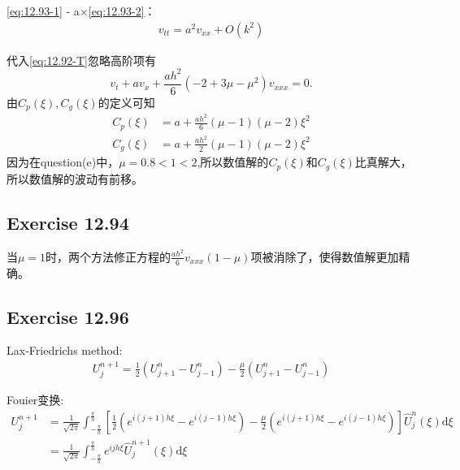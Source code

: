 \documentclass[UTF8]{ctexart}
\newcommand{\dif}{\mathrm{d}}
\begin{document}
\eqref{eq:12.93-1} - a$\times$\eqref{eq:12.93-2}：
\begin{equation}
    \label{eq:12.93-6}
    \begin{aligned}
        v_{tt} = a^2v_{xx} + O(k^2)
    \end{aligned}
\end{equation}

代入\eqref{eq:12.92-T}忽略高阶项有
$$
v_t + av_x + \frac{ah^2}{6}(-2+3\mu-\mu^2)v_{xxx}=0.
$$
由$C_p(\xi),C_g(\xi)$的定义可知
\begin{equation}
    \begin{aligned}
        C_p(\xi) &= a + \frac{ah^2}{6}(\mu-1)(\mu-2)\xi^2 \\
        C_g(\xi) &= a + \frac{ah^2}{2}(\mu-1)(\mu-2)\xi^2
    \end{aligned}
\end{equation}
因为在question(e)中，$\mu = 0.8<1<2$,所以数值解的$C_p(\xi)$和$C_g(\xi)$比真解大，
所以数值解的波动有前移。



\subsection*{Exercise 12.94}
当$\mu=1$时，两个方法修正方程的$\frac{ah^2}{6}v_{xxx}(1-\mu)$项被消除了，使得数值解更加精确。

\subsection*{Exercise 12.96}
Lax-Friedrichs method:
\begin{equation}
    \label{eq:12.96-LF}
    \begin{aligned}
        U^{n+1}_j = \frac{1}{2}(U^n_{j+1}-U^n_{j-1})-\frac{\mu}{2}(U^n_{j+1}-U^n_{j-1})
    \end{aligned}
\end{equation}

Fouier变换:
\begin{equation}
    \label{eq:12.96-F}
    \begin{aligned}
        U^{n+1}_j &= \frac{1}{\sqrt{2\pi}}\int_{-\frac{\pi}{h}}^{\frac{\pi}{h}}
        [\frac{1}{2}(e^{i(j+1)h\xi} - e^{i(j-1)h\xi}) - \frac{\mu}{2}(e^{i(j+1)h\xi} - e^{i(j-1)h\xi})]\hat{U}^n_j(\xi) \dif \xi \\
        &= \frac{1}{\sqrt{2\pi}}\int_{-\frac{\pi}{h}}^{\frac{\pi}{h}}e^{ijh\xi}\hat{U}^{n+1}_j(\xi) \dif \xi
    \end{aligned}
\end{equation}
\end{document}
